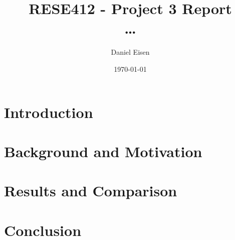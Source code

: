 \documentclass[11pt]{article}
\title{RESE412 - Project 3 Report \\ \dots}
\author{Daniel Eisen}
\date{\today}
\begin{document}
\maketitle
\section{Introduction}
\section{Background and Motivation}

\section{Results and Comparison}
\section{Conclusion}


\nocite{*}


\end{document}
